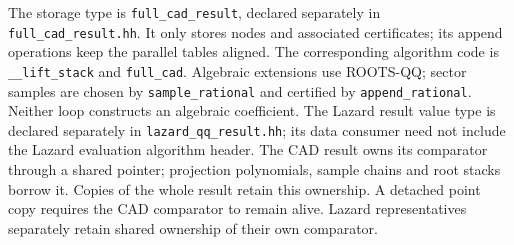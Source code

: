\documentclass[11pt]{article}
\theoremstyle{definition}
\begin{document}
The storage type is \texttt{full\_cad\_result}, declared separately in
\texttt{full\_cad\_result.hh}. It only stores nodes and associated certificates;
its append operations keep the parallel tables aligned.
The corresponding algorithm code is \texttt{\_\_lift\_stack} and
\texttt{full\_cad}. Algebraic extensions use ROOTS-QQ; sector samples are chosen by
\texttt{sample\_rational} and certified by \texttt{append\_rational}.
Neither loop constructs an algebraic coefficient.
The Lazard result value type is declared separately in
\texttt{lazard\_qq\_result.hh}; its data consumer need not include the Lazard
evaluation algorithm header. The CAD result owns its comparator through a shared
pointer; projection polynomials, sample chains and root stacks borrow it. Copies
of the whole result retain this ownership. A detached point copy requires the
CAD comparator to remain alive. Lazard representatives separately retain shared
ownership of their own comparator.
\end{document}
